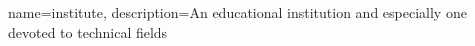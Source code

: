 {
        name=institute,
        description={An educational institution and especially one devoted to technical fields }
}